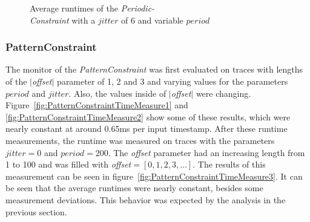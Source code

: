 \begin{figure}
\begin{minipage}{0.45\textwidth}
		\centering
		\caption{Average runtimes of the \textit{Periodic-\\Constraint} with a $jitter$ of 6 and variable $period$}
		\label{fig:PeriodicConstrainttRunTime2}
	\end{minipage}
\end{figure}



\subsubsection{PatternConstraint}
	The monitor of the \emph{PatternConstraint} was first evaluated on traces with lengths of the $|$\textit{offset}$|$ parameter of 1, 2 and 3 and varying values for the parameters $period$ and $jitter$. Also, the values inside of $|$\textit{offset}$|$ were changing. Figure~\ref{fig:PatternConstraintTimeMeasure1} and \ref{fig:PatternConstraintTimeMeasure2} show some of these results, which were nearly constant at around 0.65ms per input timestamp. After these runtime measurements, the runtime was measured on traces with the parameters $jitter=0$ and $period=200$. The \textit{offset} parameter had an increasing length from 1 to 100 and was filled with \textit{offset}$=[0, 1, 2, 3, ...]$. The results of this measurement can be seen in figure~\ref{fig:PatternConstraintTimeMeasure3}. It can be seen that the average runtimes were nearly constant, besides some measurement deviations. This behavior was expected by the analysis in the previous section.
	

